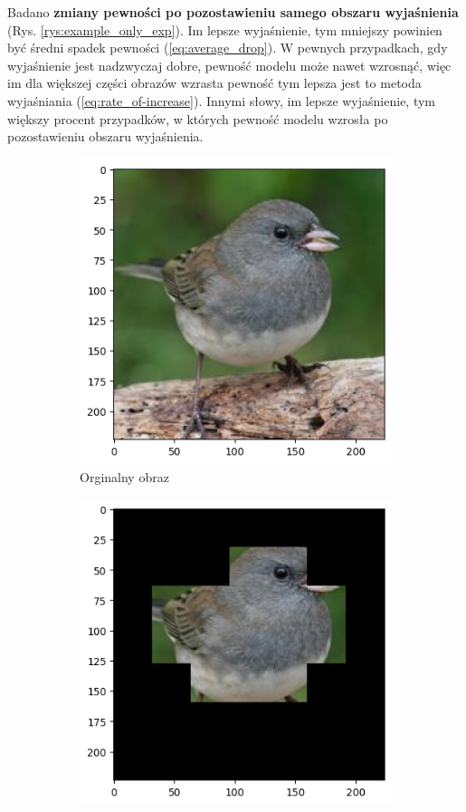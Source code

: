 Badano \textbf{zmiany pewności po pozostawieniu samego obszaru wyjaśnienia} (Rys. \ref{rys:example_only_exp}).
Im lepsze wyjaśnienie, tym mniejszy powinien być średni spadek pewności (\ref{eq:average_drop}).
W pewnych przypadkach, gdy wyjaśnienie jest nadzwyczaj dobre, pewność modelu może nawet wzrosnąć, więc im dla większej części obrazów wzrasta pewność tym lepsza jest to metoda wyjaśniania (\ref{eq:rate_of-increase}).
Innymi słowy, im lepsze wyjaśnienie, tym większy procent przypadków, w których pewność modelu wzrosła po pozostawieniu obszaru wyjaśnienia.

\begin{figure}[h]
	\begin{subfigure}[b]{0.45\textwidth}
		\centering\includegraphics[width=.9\textwidth]{img/parameters/quality/base}
		\caption{Orginalny obraz}
	\end{subfigure}
	\begin{subfigure}[b]{0.45\textwidth}
		\centering\includegraphics[width=.9\textwidth]{img/parameters/quality/mask}

\end{subfigure}
\end{figure}
